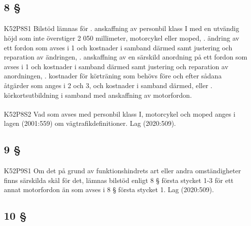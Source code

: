 \documentclass[a4paper,notitlepage,openany,10pt]{book}
\begin{document}
\subsection*{8 §}
\paragraph*{}
{\tiny K52P8S1}
Bilstöd lämnas för
. anskaffning av personbil klass I med en utvändig höjd som inte överstiger 2 050 millimeter, motorcykel eller moped,
. ändring av ett fordon som avses i 1 och kostnader i samband därmed samt justering och reparation av ändringen,
. anskaffning av en särskild anordning på ett fordon som avses i 1 och kostnader i samband därmed samt justering och reparation av anordningen,
. kostnader för körträning som behövs före och efter sådana åtgärder som anges i 2 och 3, och kostnader i samband därmed, eller
. körkortsutbildning i samband med anskaffning av motorfordon.
\paragraph*{}
{\tiny K52P8S2}
Vad som avses med personbil klass I, motorcykel och moped anges i lagen (2001:559) om vägtrafikdefinitioner.
Lag (2020:509).
\subsection*{9 §}
\paragraph*{}
{\tiny K52P9S1}
Om det på grund av funktionshindrets art eller andra omständigheter finns särskilda skäl för det, lämnas bilstöd enligt 8 § första stycket 1-3 för ett annat motorfordon än som avses i 8 § första stycket 1.
Lag (2020:509).
\subsection*{10 §}
\end{document}
